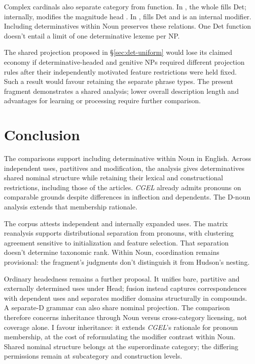 \documentclass[12pt]{article}
\begin{document}
Complex cardinals also separate category from function. In , the whole  fills Det; internally,  modifies the magnitude head  \citep[§4]{reynolds2026numerals}. In ,  fills Det and  is an internal modifier. Including determinatives within Noun preserves these relations. One Det function doesn't entail a limit of one determinative lexeme per NP.

The shared projection proposed in §\ref{sec:det-uniform} would lose its claimed economy if determinative-headed and genitive NPs required different projection rules after their independently motivated feature restrictions were held fixed. Such a result would favour retaining the separate phrase types. The present fragment demonstrates a shared analysis; lower overall description length and advantages for learning or processing require further comparison.

\section{Conclusion}\label{sec:conclusion}

The comparisons support including determinative within Noun in English. Across independent uses, partitives and modification, the analysis gives determinatives shared nominal structure while retaining their lexical and constructional restrictions, including those of the articles. \textit{CGEL} already admits pronouns on comparable grounds despite differences in inflection and dependents. The D-noun analysis extends that membership rationale.

The corpus attests independent and internally expanded uses. The matrix reanalysis supports distributional separation from pronouns, with clustering agreement sensitive to initialization and feature selection. That separation doesn't determine taxonomic rank. Within Noun, coordination remains provisional: the fragment's judgments don't distinguish it from Hudson's nesting.

Ordinary headedness remains a further proposal. It unifies bare, partitive and externally determined uses under Head; fusion instead captures correspondences with dependent uses and separates modifier domains structurally in compounds. A separate-D grammar can also share nominal projection. The comparison therefore concerns inheritance through Noun versus cross-category licensing, not coverage alone. I favour inheritance: it extends \textit{CGEL}'s rationale for pronoun membership, at the cost of reformulating the modifier contrast within Noun. Shared nominal structure belongs at the superordinate category; the differing permissions remain at subcategory and construction levels.
\end{document}
